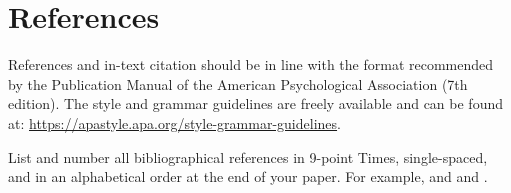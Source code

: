 \documentclass[10pt]{article}
\newcommand{\sansserifformat}[1]{\fontfamily{cmss}{ #1}}%
\begin{document}




\section{References} 

References and in-text citation should be in line with the format recommended by the Publication Manual of the American Psychological Association (7th edition). The style and grammar guidelines are freely available and can be found at:  \url{https://apastyle.apa.org/style-grammar-guidelines}.

List and number all bibliographical references in 9-point Times, single-spaced, and in an alphabetical order at the end of your paper. For example, \cite{Castells2010, Allen1997} and \cite{Bloomberg2018} and \cite{Allen1997}.


% 
% 

\printbibliography
\end{document}
